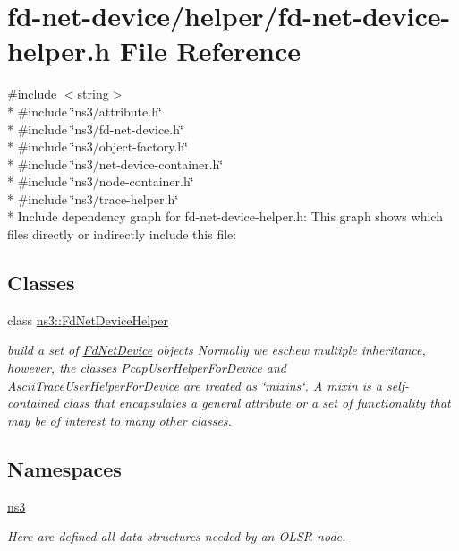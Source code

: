 \hypertarget{fd-net-device-helper_8h}{}\section{fd-\/net-\/device/helper/fd-\/net-\/device-\/helper.h File Reference}
\label{fd-net-device-helper_8h}
{\ttfamily \#include $<$string$>$}\\*
{\ttfamily \#include \char`\"{}ns3/attribute.\+h\char`\"{}}\\*
{\ttfamily \#include \char`\"{}ns3/fd-\/net-\/device.\+h\char`\"{}}\\*
{\ttfamily \#include \char`\"{}ns3/object-\/factory.\+h\char`\"{}}\\*
{\ttfamily \#include \char`\"{}ns3/net-\/device-\/container.\+h\char`\"{}}\\*
{\ttfamily \#include \char`\"{}ns3/node-\/container.\+h\char`\"{}}\\*
{\ttfamily \#include \char`\"{}ns3/trace-\/helper.\+h\char`\"{}}\\*
Include dependency graph for fd-\/net-\/device-\/helper.h\+:
This graph shows which files directly or indirectly include this file\+:
\subsection*{Classes}
\begin{DoxyCompactItemize}
\item 
class \hyperlink{classns3_1_1FdNetDeviceHelper}{ns3\+::\+Fd\+Net\+Device\+Helper}
\begin{DoxyCompactList}\small\item\em build a set of \hyperlink{classns3_1_1FdNetDevice}{Fd\+Net\+Device} objects Normally we eschew multiple inheritance, however, the classes Pcap\+User\+Helper\+For\+Device and Ascii\+Trace\+User\+Helper\+For\+Device are treated as \char`\"{}mixins\char`\"{}. A mixin is a self-\/contained class that encapsulates a general attribute or a set of functionality that may be of interest to many other classes. \end{DoxyCompactList}\end{DoxyCompactItemize}
\subsection*{Namespaces}
\begin{DoxyCompactItemize}
\item 
 \hyperlink{namespacens3}{ns3}
\begin{DoxyCompactList}\small\item\em Here are defined all data structures needed by an O\+L\+SR node. \end{DoxyCompactList}\end{DoxyCompactItemize}
